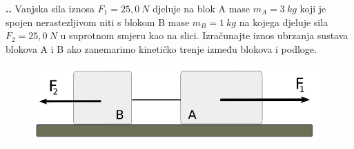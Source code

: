 


\noindent 
\textbf{
\thecjelina.\thezadatak.}
Vanjska sila iznosa $F_1=25,0\ N$ djeluje na blok A mase $m_A=3\ kg$ koji je spojen nerastezljivom niti s blokom B mase $m_B=1\ kg$ na kojega djeluje sila $F_2=25,0\ N$ u  suprotnom smjeru kao na slici. Izračunajte iznos ubrzanja sustava blokova A i B ako zanemarimo kinetičko trenje između blokova i podloge.


\begin{figure}[h]%
  \begin{center}
    \includegraphics[scale=0.35]{03_Dinamika_materijalne_tocke/zadatak_D308.png}
  \end{center}
\end{figure}


